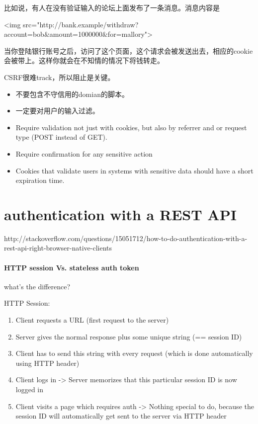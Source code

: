 比如说，有人在没有验证输入的论坛上面发布了一条消息。消息内容是
\begin{JavaScript}
<img src="http://bank.example/withdraw?account=bob&amount=1000000&for=mallory">
\end{JavaScript}

当你登陆银行账号之后，访问了这个页面，这个请求会被发送出去，相应的cookie会被带上。这样你就会在不知情的情况下将钱转走。


CSRF很难track，所以阻止是关键。

\begin{itemize}
\item 不要包含不守信用的domian的脚本。
\item 一定要对用户的输入过滤。
\item Require validation not just with cookies, but also by referrer and or request type (POST instead of GET).
\end{itemize}

\begin{itemize}
\item Require confirmation for any sensitive action
\item Cookies that validate users in systems with sensitive data should have a short expiration time.
\end{itemize}

\section{authentication with a REST API}
http://stackoverflow.com/questions/15051712/how-to-do-authentication-with-a-rest-api-right-browser-native-clients

\paragraph{HTTP session Vs. stateless auth token} what's the difference?

HTTP Session:

\begin{enumerate}
\item Client requests a URL (first request to the server)
\item Server gives the normal response plus some unique string (== session ID)
\item Client has to send this string with every request (which is done automatically using HTTP header)
\item Client logs in -> Server memorizes that this particular session ID is now logged in
\item Client visits a page which requires auth -> Nothing special to do, because the session ID will automatically get sent to the server via HTTP header
\end{enumerate}


